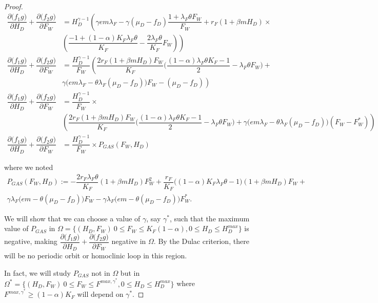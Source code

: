\documentclass{article}
\newcommand{\lfw}{\lambda_{F}}
\newcommand{\lfw}{\lambda_{F}}
\begin{document}
\begin{proof}
\begin{align*}
\dfrac{\partial \Big(f_1 g \Big)}{\partial H_D} + \dfrac{\partial \Big(f_2 g \Big)}{\partial F_W} &= H_D^{\gamma - 1} \left( \gamma e m \lfw - \gamma (\mu_D - f_D) \dfrac{1 + \lfw \theta F_W}{F_W} + r_F(1 + \beta m H_D) \times \right. \\ & \left. \left(\dfrac{-1 + (1-\alpha)K_F \lfw \theta}{K_F}-  \dfrac{2 \lfw \theta}{K_F} F_W\right) \right) \\
\dfrac{\partial \Big(f_1 g \Big)}{\partial H_D} + \dfrac{\partial \Big(f_2 g \Big)}{\partial F_W} &= \dfrac{H_D^{\gamma - 1}}{F_W} \left( \dfrac{2 r_F(1+ \beta m H_D) F_W}{K_F} \Big(\dfrac{(1-\alpha)\lfw \theta K_F - 1}{2} - \lfw \theta F_W \Big) + \right. \\ & \left. \gamma \Big(e m \lfw - \theta \lfw(\mu_D - f_D) \Big) F_W - (\mu_D - f_D) \right) \\
\dfrac{\partial \Big(f_1 g \Big)}{\partial H_D} + \dfrac{\partial \Big(f_2 g \Big)}{\partial F_W} &=\dfrac{H_D^{\gamma - 1}}{F_W} \times \\&  \left( \dfrac{2 r_F(1+ \beta m H_D) F_W}{K_F} \Big(\dfrac{(1-\alpha) \lfw \theta K_F - 1}{2} - \lfw \theta F_W \Big) +  \gamma \Big(e m \lfw - \theta \lfw(\mu_D - f_D) \Big)( F_W - F_W^*) \right) \\
\dfrac{\partial \Big(f_1 g \Big)}{\partial H_D} + \dfrac{\partial \Big(f_2 g \Big)}{\partial F_W} &= \dfrac{H_D^{\gamma - 1}}{F_W} \times P_{GAS}(F_W, H_D)
\end{align*}

where we noted
\begin{multline}
P_{GAS}(F_W, H_D) := - \dfrac{2 r_F \lfw \theta}{K_F} (1 + \beta m H_D) F_W^2 + \dfrac{r_F}{K_F} \Big((1-\alpha)K_F \lfw \theta - 1\Big) (1 + \beta m H_D) F_W + \\ \gamma \lfw \Big(em - \theta (\mu_D - f_D)\Big) F_W - \gamma \lfw \Big(em - \theta (\mu_D - f_D)\Big) F_W^*.
\end{multline}

We will show that we can choose a value of $\gamma$, say $\gamma^*$, such that the maximum value of $P_{GAS}$ in $\Omega = \{(H_D, F_W) \ 0 \leq F_W \leq K_F(1-\alpha) , 0 \leq H_D \leq H_D^{max}\}$ is negative, making $\dfrac{\partial \Big(f_1 g \Big)}{\partial H_D} + \dfrac{\partial \Big(f_2 g \Big)}{\partial F_W}$ negative in $\Omega$. By the Dulac criterion, there will be no periodic orbit or homoclinic loop in this region.

In fact, we will study $P_{GAS}$ not in $\Omega$ but in $\Omega^* = \{(H_D, F_W) \ 0 \leq F_W \leq F^{max, \gamma^*} , 0 \leq H_D \leq H_D^{max}\}$ where $F^{max, \gamma^*} \geq (1-\alpha)K_F$ will depend on $\gamma^*$.  


\end{proof}
\end{document}
